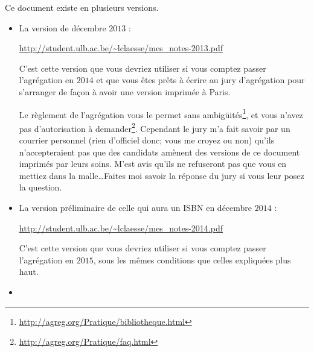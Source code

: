 





\clearpage

\thispagestyle{empty}

Ce document existe en plusieurs versions.
\begin{itemize}
    \item
        La version de décembre \( 2013\) :
        \begin{center}
            \url{http://student.ulb.ac.be/~lclaesse/mes_notes-2013.pdf}
        \end{center}
        C'est cette version que vous devriez utiliser si vous comptez passer l'agrégation en $2014$ et que vous êtes prêts à écrire au jury d'agrégation pour s'arranger de façon à avoir une version imprimée à Paris.
        
        Le règlement de l'agrégation vous le permet sans ambigüités\footnote{\url{http://agreg.org/Pratique/bibliotheque.html}}, et vous n'avez pas d'autorisation à demander\footnote{\url{http://agreg.org/Pratique/faq.html}}. Cependant le jury m'a fait savoir par un courrier personnel (rien d'officiel donc; vous me croyez ou non) qu'ils n'accepteraient pas que des candidats amènent des versions de ce document imprimés par leurs soins. M'est avis qu'ils ne refuseront pas que vous en mettiez dans la malle\ldots Faites moi savoir la réponse du jury si vous leur posez la question.

        
    \item 
        La version préliminaire de celle qui aura un ISBN en décembre $2014$ :
        \begin{center}
        \url{http://student.ulb.ac.be/~lclaesse/mes_notes-2014.pdf}
        \end{center}

        C'est cette version que vous devriez utiliser si vous comptez passer l'agrégation en $2015$, sous les mêmes conditions que celles expliquées plus haut.
        
    \item


\end{itemize}
